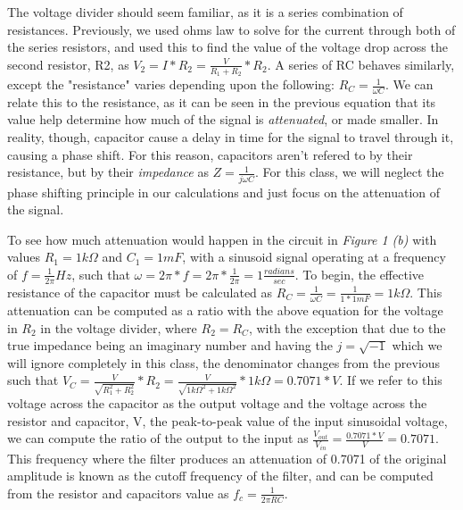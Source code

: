 \documentclass[12pt]{article}
\begin{document}
The voltage divider should seem familiar, as it is a series combination of resistances. Previously, we used ohms law to solve for the current through both of the series resistors, and used this to find the value of the voltage drop across the second resistor, R2, as $V_{2} = I * R_{2} = \frac{V}{R_{1} + R_{2}} * R_{2}$. A series of RC behaves similarly, except the "resistance" varies depending upon the following: $R_{C} = \frac{1}{\omega C}$. We can relate this to the resistance, as it can be seen in the previous equation that its value help determine how much of the signal is \textit{attenuated}, or made smaller. In reality, though, capacitor cause a delay in time for the signal to travel through it, causing a phase shift. For this reason, capacitors aren't refered to by their resistance, but by their \textit{impedance} as $Z = \frac{1}{j \omega C}$. For this class, we will neglect the phase shifting principle in our calculations and just focus on the attenuation of the signal.

To see how much attenuation would happen in the circuit in \textit{Figure 1 (b)} with values $R_{1} = 1k \Omega$ and $C_{1} = 1 mF$, with a sinusoid signal operating at a frequency of $f= \frac{1}{2\pi} Hz$, such that $\omega = 2\pi *f = 2\pi* \frac{1}{2\pi} = 1 \frac{radians}{sec}$. To begin, the effective resistance of the capacitor must be calculated as $R_{C} = \frac{1}{\omega C} = \frac{1}{1 * 1mF} = 1k\Omega$. This attenuation can be computed as a ratio with the above equation for the voltage in $R_{2}$ in the voltage divider, where $R_{2} = R_{C}$, with the exception that due to the true impedance being an imaginary number and having the $j=\sqrt{-1}$ which we will ignore completely in this class, the denominator changes from the previous such that $V_{C} = \frac{V}{\sqrt{R_{1}^{2} + R_{2}^{2}}} * R_{2} = \frac{V}{\sqrt{1k\Omega^{2} + 1k\Omega^{2}}} * 1k\Omega = 0.7071 * V$. If we refer to this voltage across the capacitor as the output voltage and the voltage across the resistor and capacitor, V, the peak-to-peak value of the input sinusoidal voltage, we can compute the ratio of the output to the input as $\frac{V_{out}}{V_{in}} = \frac{0.7071*V}{V} = 0.7071$. This frequency where the filter produces an attenuation of 0.7071 of the original amplitude is known as the cutoff frequency of the filter, and can be computed from the resistor and capacitors value as $f_{c} = \frac{1}{2\pi RC}$.
\end{document}
